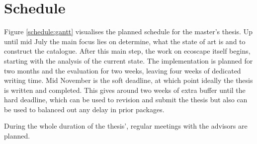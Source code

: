 \chapter{Schedule}

Figure \ref{schedule:gantt} visualises the planned schedule for the master's thesis.
Up until mid July the main focus lies on determine, what the state of art is and to construct the catalogue.
After this main step, the work on ecoscape itself begins, starting with the analysis of the current state.
The implementation is planned for two months and the evaluation for two weeks, leaving four weeks of dedicated writing time.
Mid November is the soft deadline, at which point ideally the thesis is written and completed. 
This gives around two weeks of extra buffer until the hard deadline, which can be used to revision and submit the thesis but also can be used to balanced out any delay in prior packages.


During the whole duration of the thesis', regular meetings with the advisors are planned.

